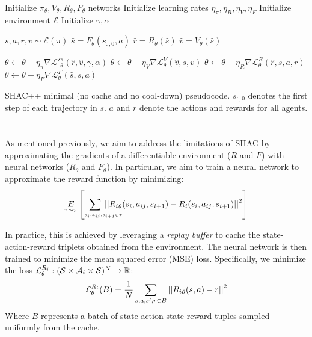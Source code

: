 \begin{algorithm}[t]
    \begin{algorithmic}[1]
    \STATE Initialize $\pi_\theta,V_\theta,R_\theta,F_\theta$ networks
    \STATE Initialize learning rates $\eta_\pi, \eta_R, \eta_V, \eta_F$
    \STATE Initialize environment $\mathcal{E}$
    \STATE Initialize $\gamma, \alpha$
    
        
        \STATE $s,a,r,v \sim \mathcal{E}(\pi)$
        \STATE $\hat{s} = F_\theta(s_{:,0}, a)$
        \STATE $\hat{r} = R_\theta(\hat{s})$
        \STATE $\hat{v} = V_\theta(\hat{s})$
        
        \STATE $\theta \gets \theta - \eta_\pi \nabla \mathcal{L'}^\pi_\theta(\hat{r},\hat{v},\gamma,\alpha)$
        \STATE $\theta \gets \theta - \eta_V \nabla \mathcal{L}^V_\theta(\hat{v},s,v)$
        \STATE $\theta \gets \theta - \eta_R \nabla \mathcal{L}^R_\theta(\hat{r},s,a,r)$
        \STATE $\theta \gets \theta - \eta_F \nabla \mathcal{L}^F_\theta(\hat{s},s,a)$
    
    \ENDFOR
    
    \end{algorithmic}
    \caption{SHAC++ minimal (no cache and no cool-down) pseudocode. $s_{:,0}$ denotes the first step of each trajectory in $s$. $a$ and $r$ denote the actions and rewards for all agents.}
    \label{alg:shacpp}
\end{algorithm}


\section{\fname{}}

As mentioned previously, we aim to address the limitations of SHAC by approximating the gradients of a differentiable environment ($R$ and $F$) with neural networks ($R_\theta$ and $F_\theta$). In particular, we aim to train a neural network to approximate the reward function by minimizing: 
\begin{align*}
    \underset{\tau\sim\pi}{E}\left[\hspace{-.7cm}\sum_{\hspace{.7cm}\scriptscriptstyle s_i,a_{ij},s_{i+1}\in\tau} \hspace{-.8cm}\left\vert\left\vert {\rewards{i}}_\theta(s_i, a_{ij}, s_{i+1}) -\rewards{i}(s_i, a_{ij}, s_{i+1}) \right\vert\right\vert^2\right] 
\end{align*}

In practice, this is achieved by leveraging a \emph{replay buffer} to cache the state-action-reward triplets obtained from the environment. The neural network is then trained to minimize the mean squared error (MSE) loss. Specifically, we minimize the loss $\mathcal{L}_\theta^{R_{i}}:(\mathcal{S}\times\mathcal{A}_{i}\times\mathcal{S})^N\rightarrow\mathbb{R}$:
$$ \mathcal{L}_\theta^{R_{i}}(B) = \frac{1}{N}\sum_{s,a,s',r \in B}\left|\left| {R_{i}}_\theta(s, a) - r \right|\right|^2 $$
Where $B$ represents a batch of state-action-state-reward tuples sampled uniformly from the cache.

